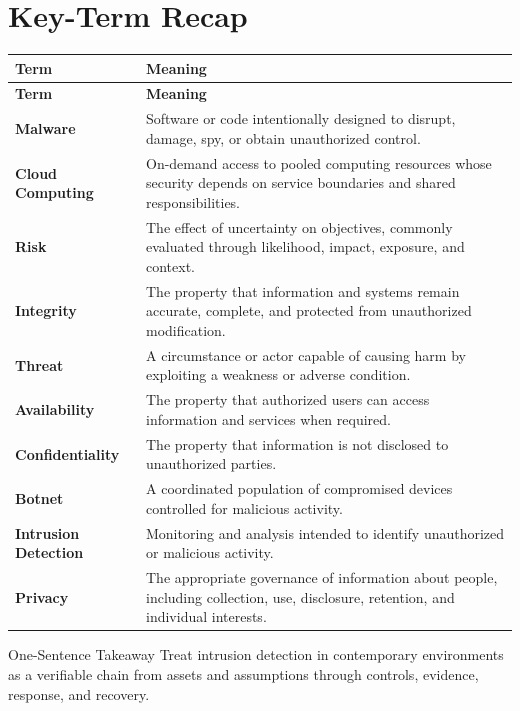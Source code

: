 \documentclass[11pt,letterpaper]{article}
\begin{document}
\section*{Key-Term Recap}
\begin{longtable}{>{\raggedright\arraybackslash}p{}>{\raggedright\arraybackslash}p{}}
\toprule\rowcolor{Navy}\color{white}\textbf{Term} & \color{white}\textbf{Meaning}\\\midrule
\endfirsthead
\toprule\rowcolor{Navy}\color{white}\textbf{Term} & \color{white}\textbf{Meaning}\\\midrule
\endhead
\textbf{Malware} & Software or code intentionally designed to disrupt, damage, spy, or obtain unauthorized control. \\\midrule
\textbf{Cloud Computing} & On-demand access to pooled computing resources whose security depends on service boundaries and shared responsibilities. \\\midrule
\textbf{Risk} & The effect of uncertainty on objectives, commonly evaluated through likelihood, impact, exposure, and context. \\\midrule
\textbf{Integrity} & The property that information and systems remain accurate, complete, and protected from unauthorized modification. \\\midrule
\textbf{Threat} & A circumstance or actor capable of causing harm by exploiting a weakness or adverse condition. \\\midrule
\textbf{Availability} & The property that authorized users can access information and services when required. \\\midrule
\textbf{Confidentiality} & The property that information is not disclosed to unauthorized parties. \\\midrule
\textbf{Botnet} & A coordinated population of compromised devices controlled for malicious activity. \\\midrule
\textbf{Intrusion Detection} & Monitoring and analysis intended to identify unauthorized or malicious activity. \\\midrule
\textbf{Privacy} & The appropriate governance of information about people, including collection, use, disclosure, retention, and individual interests. \\\midrule
\bottomrule
\end{longtable}
\begin{CornellExamBox}{One-Sentence Takeaway}
Treat intrusion detection in contemporary environments as a verifiable chain from assets and assumptions through controls, evidence, response, and recovery.
\end{CornellExamBox}
\end{document}
